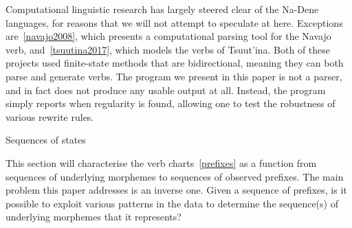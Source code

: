 Computational linguistic research has largely steered clear of the Na-Dene languages, for reasons that we will
not attempt to speculate at here. Exceptions are~\ref{navajo2008}, which presents a computational parsing tool
for the Navajo verb, and~\ref{tsuutina2017}, which models the verbs of Tsuut'ina. Both of these projects used
finite-state methods that are bidirectional, meaning they can both parse and generate verbs. The program we
present in this paper is not a parser, and in fact does not produce any usable output at all. Instead, the program
simply reports when regularity is found, allowing one to test the robustness of various rewrite rules.

\advsect Sequences of states

This section will characterise the verb charts~\ref{prefixes} as a function from sequences of underlying morphemes
to sequences of observed prefixes. The main problem this paper addresses is an inverse one. Given a sequence
of prefixes, is it possible to exploit various patterns in the data to
determine the sequence(s) of underlying morphemes that it represents?

